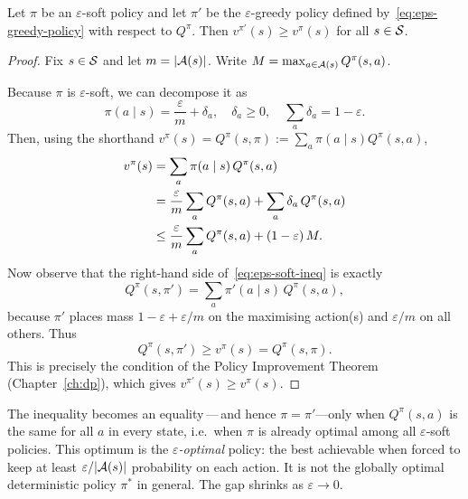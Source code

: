 \begin{theorem}
\label{thm:eps-soft-improvement}
Let $\pi$ be an $\varepsilon$-soft policy and let $\pi'$ be the $\varepsilon$-greedy policy defined by~\eqref{eq:eps-greedy-policy} with respect to $Q^\pi$.  Then $v^{\pi'}(s) \ge v^\pi(s)$ for all $s \in \mathcal{S}$.
\end{theorem}

\begin{proof}
Fix $s \in \mathcal{S}$ and let $m = |\mathcal{A}(s)|$.  Write $M = \max_{a \in \mathcal{A}(s)} Q^\pi(s, a)$.

Because $\pi$ is $\varepsilon$-soft, we can decompose it as
\[
  \pi(a \mid s) = \frac{\varepsilon}{m} + \delta_a, \quad \delta_a \ge 0, \quad \sum_a \delta_a = 1 - \varepsilon.
\]
Then, using the shorthand $v^\pi(s) = Q^\pi(s, \pi) := \sum_a \pi(a \mid s) Q^\pi(s, a)$,
\begin{align}
  v^\pi(s)
  &= \sum_{a} \pi(a \mid s)\,Q^\pi(s, a) \notag \\
  &= \frac{\varepsilon}{m} \sum_a Q^\pi(s, a) + \sum_a \delta_a\,Q^\pi(s, a) \notag \\
  &\le \frac{\varepsilon}{m} \sum_a Q^\pi(s, a) + (1 - \varepsilon)\,M. \label{eq:eps-soft-ineq}
\end{align}
Now observe that the right-hand side of~\eqref{eq:eps-soft-ineq} is exactly
\[
  Q^\pi(s, \pi') = \sum_a \pi'(a \mid s)\,Q^\pi(s, a),
\]
because $\pi'$ places mass $1 - \varepsilon + \varepsilon/m$ on the maximising action(s) and $\varepsilon/m$ on all others.  Thus
\[
  Q^\pi(s, \pi') \ge v^\pi(s) = Q^\pi(s, \pi).
\]
This is precisely the condition of the Policy Improvement Theorem (Chapter~\ref{ch:dp}), which gives $v^{\pi'}(s) \ge v^\pi(s)$.
\end{proof}

\begin{remark}
The inequality becomes an equality\,---\,and hence $\pi = \pi'$---only when $Q^\pi(s, a)$ is the same for all $a$ in every state, i.e.\ when $\pi$ is already optimal among all $\varepsilon$-soft policies.  This optimum is the \emph{$\varepsilon$-optimal} policy: the best achievable when forced to keep at least $\varepsilon/|\mathcal{A}(s)|$ probability on each action.  It is not the globally optimal deterministic policy $\pi^*$ in general.  The gap shrinks as $\varepsilon \to 0$.
\end{remark}

